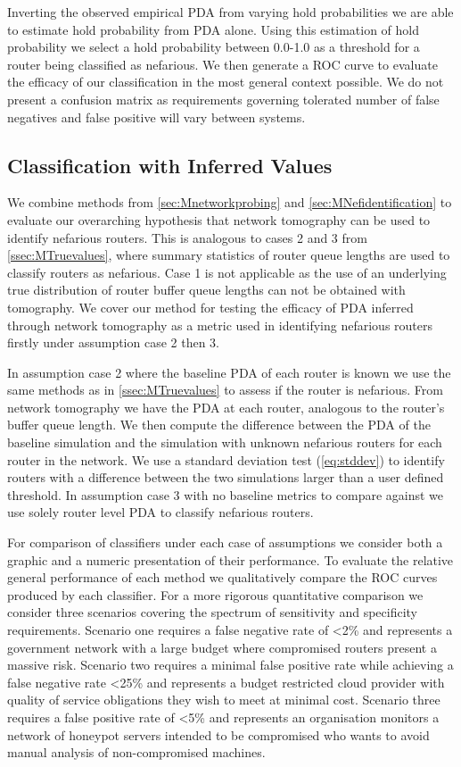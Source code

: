   Inverting the observed empirical PDA from varying hold probabilities we are able to estimate hold probability from PDA alone. Using this estimation of hold probability we select a hold probability between 0.0-1.0 as a threshold for a router being classified as nefarious. We then generate a ROC curve to evaluate the efficacy of our classification in the most general context possible. We do not present a confusion matrix  as requirements governing tolerated number of false negatives and false positive will vary between systems.\par
 
  
  \subsection{Classification with Inferred Values}
  \label{ssec:MInferredvalues}
  We combine methods from \cref{sec:Mnetworkprobing} and \cref{sec:MNefidentification} to evaluate our overarching hypothesis that network tomography can be used to identify nefarious routers. This is analogous to cases 2 and 3 from \cref{ssec:MTruevalues}, where summary statistics of router queue lengths are used to classify routers as nefarious. Case 1 is not applicable as the use of an underlying true distribution of router buffer queue lengths can not be obtained with tomography. We cover our method for testing the efficacy of PDA inferred through network tomography as a metric used in identifying nefarious routers firstly under assumption case 2 then 3.\par
  In assumption case 2 where the baseline PDA of each router is known we use the same methods as in \cref{ssec:MTruevalues} to assess if the router is nefarious. From network tomography we have the PDA at each router, analogous to the router's buffer queue length. We then compute the difference between the PDA of the baseline simulation and the simulation with unknown nefarious routers for each router in the network. We use a standard deviation test (\cref{eq:stddev}) to identify routers with a difference between the two simulations larger than a user defined threshold. In assumption case 3 with no baseline metrics to compare against we use solely router level PDA to classify nefarious routers.\par
  For comparison of classifiers under each case of assumptions we consider both a graphic and a numeric presentation of their performance. To evaluate the relative general performance of each method we qualitatively compare the ROC curves produced by each classifier. For a more rigorous quantitative comparison we consider three scenarios covering the spectrum of sensitivity and specificity requirements. Scenario one requires a false negative rate of <2\% and represents a government network with a large budget where compromised routers present a massive risk. Scenario two requires a minimal false positive rate while achieving a false negative rate <25\% and represents a budget restricted cloud provider with quality of service obligations they wish to meet at minimal cost. Scenario three requires a false positive rate of <5\% and represents an organisation monitors a network of honeypot servers intended to be compromised who wants to avoid manual analysis of non-compromised machines.

